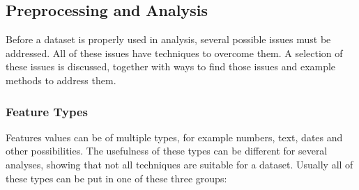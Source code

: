 \documentclass[10pt,a4paper]{article}
\begin{document}
	\subsection{Preprocessing and Analysis}
	\label{subsec:Preprocessing}
	
	Before a dataset is properly used in analysis, several possible issues must be addressed. All of these issues have techniques to overcome them. A selection of these issues is discussed, together with ways to find those issues and example methods to address them.
	
	\subsubsection{Feature Types}
	\label{subsec:FeatureTypes}
	
	Features values can be of multiple types, for example numbers, text, dates and other possibilities. The usefulness of these types can be different for several analyses, showing that not all techniques are suitable for a dataset. Usually all of these types  can be put in one of these three groups:
	
\end{document}

